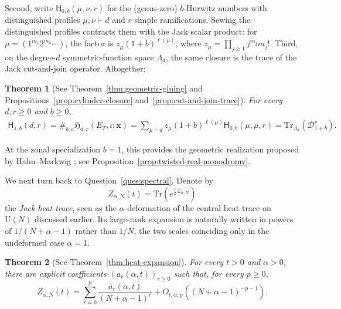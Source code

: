 \documentclass[11pt,a4paper,reqno]{article}
\newtheorem{theorem}{Theorem}[section]
\theoremstyle{definition}
\theoremstyle{remark}
\newcommand\U{{\mathrm U}}
\newcommand\Tr{{\mathrm{Tr}}}
\newcommand\Hb{{\mathsf H}}
\newcommand\ellpart{{\ell}}
\begin{document}
Second, write $\Hb_{0,b}(\mu,\nu,r)$ for the (genus-zero) $b$-Hurwitz numbers with distinguished profiles $\mu,\nu\vdash d$ and $r$ simple ramifications.  Sewing the distinguished profiles contracts them with the Jack scalar product: for $\mu=(1^{m_1}2^{m_2}\cdots)$, the factor is $z_\mu(1+b)^{\ellpart(\mu)}$, where $z_\mu=\prod_{j\geq1}j^{m_j}m_j!$.  Third, on the degree-$d$ symmetric-function space $\Lambda_d$, the same closure is the trace of the Jack cut-and-join operator.  Altogether:
\begin{theorem}[See Theorem~\ref{thm:geometric-gluing} and Propositions~\ref{prop:cylinder-closure} and~\ref{prop:cut-and-join-trace}]
For every $d,r\geq0$ and $b\geq0$,
\begin{equation}\label{eq:intro-three-realizations}
\begin{aligned}
\Hb_{1,b}(d,r)=\#_{b,a}\mathfrak H_{d,r}(E_T,\iota;\mathbf x)=\sum_{\mu\vdash d}z_\mu(1+b)^{\ellpart(\mu)}\Hb_{0,b}(\mu,\mu,r)=\Tr_{\Lambda_d}\left(\mathcal D_{1+b}^{r}\right).
\end{aligned}
\end{equation}
\end{theorem}
At the zonal specialization $b=1$, this provides the geometric realization proposed by Hahn--Markwig \cite[Remark~5]{HahnMarkwig26}; see Proposition~\ref{prop:twisted-real-monodromy}.

We next turn back to Question~\ref{ques:spectral}.  Denote by
\[
Z_{\alpha,N}(t)=\Tr(e^{\frac{t}{2}\mathscr L_{\alpha,N}})
\]
the \emph{Jack heat trace}, seen as the $\alpha$-deformation of the central heat trace on $\U(N)$ discussed earlier.  Its large-rank expansion is naturally written in powers of $1/(N+\alpha-1)$ rather than $1/N$, the two scales coinciding only in the undeformed case $\alpha=1$.

\begin{theorem}[See Theorem~\ref{thm:heat-expansion}]\label{thm:heat-expansion-informal}
For every $t>0$ and $\alpha>0$, there are explicit coefficients $(a_r(\alpha,t))_{r\geq0}$ such that, for every $p\geq0$,
\begin{equation}
Z_{\alpha,N}(t)=\sum_{r=0}^p\frac{a_r(\alpha,t)}{(N+\alpha-1)^r} +O_{t,\alpha,p}\left((N+\alpha-1)^{-p-1}\right).
\end{equation}
\end{theorem}
\end{document}

